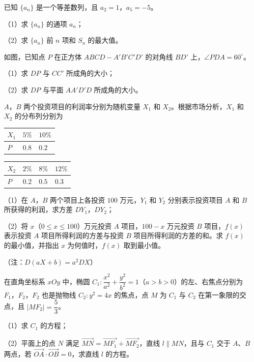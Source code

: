 \begin{question}
已知 $\{a_n\}$ 是一个等差数列，且 $a_2=1$，$a_5=-5$。

（1）求 $\{a_n\}$ 的通项 $a_n$；

（2）求 $\{a_n\}$ 前 $n$ 项和 $S_n$ 的最大值。

\Needspace{0.4\textheight}
\end{question}
\begin{question}
如图，已知点 $P$ 在正方体 $ABCD-A'B'C'D'$ 的对角线 $BD'$ 上，$\angle PDA=60^\circ$。

（1）求 $DP$ 与 $CC'$ 所成角的大小；

（2）求 $DP$ 与平面 $AA'D'D$ 所成角的大小。
\nopagebreak[4]
\begin{center}\end{center}
\nopagebreak[4]
\end{question}
\begin{question}
$A$，$B$ 两个投资项目的利润率分别为随机变量 $X_1$ 和 $X_2$。根据市场分析，$X_1$ 和 $X_2$ 的分布列分别为

\begin{center}
\begin{tabular}{lll}
\toprule
$X_1$ & $5\%$ & $10\%$ \\
\midrule
$P$ & $0.8$ & $0.2$ \\
\bottomrule
\end{tabular}
\end{center}

\begin{center}
\begin{tabular}{llll}
\toprule
$X_2$ & $2\%$ & $8\%$ & $12\%$ \\
\midrule
$P$ & $0.2$ & $0.5$ & $0.3$ \\
\bottomrule
\end{tabular}
\end{center}

（1）在 $A$，$B$ 两个项目上各投资 $100$ 万元，$Y_1$ 和 $Y_2$ 分别表示投资项目 $A$ 和 $B$ 所获得的利润，求方差 $DY_1$，$DY_2$；

（2）将 $x$（$0\leqslant x\leqslant100$）万元投资 $A$ 项目，$100-x$ 万元投资 $B$ 项目，$f(x)$ 表示投资 $A$ 项目所得利润的方差与投资 $B$ 项目所得利润的方差的和。求 $f(x)$ 的最小值，并指出 $x$ 为何值时，$f(x)$ 取到最小值。

（注：$D(aX+b)=a^2DX$）

\end{question}
\begin{question}
在直角坐标系 $xOy$ 中，椭圆 $C_1:\dfrac{x^2}{a^2}+\dfrac{y^2}{b^2}=1$（$a>b>0$）的左、右焦点分别为 $F_1$，$F_2$，$F_2$ 也是抛物线 $C_2:y^2=4x$ 的焦点，点 $M$ 为 $C_1$ 与 $C_2$ 在第一象限的交点，且 $|MF_2|=\dfrac53$。

（1）求 $C_1$ 的方程；

（2）平面上的点 $N$ 满足 $\overrightarrow{MN}=\overrightarrow{MF_1}+\overrightarrow{MF_2}$，直线 $l\parallel MN$，且与 $C_1$ 交于 $A$、$B$ 两点，若 $\overrightarrow{OA}\cdot\overrightarrow{OB}=0$，求直线 $l$ 的方程。

\end{question}

